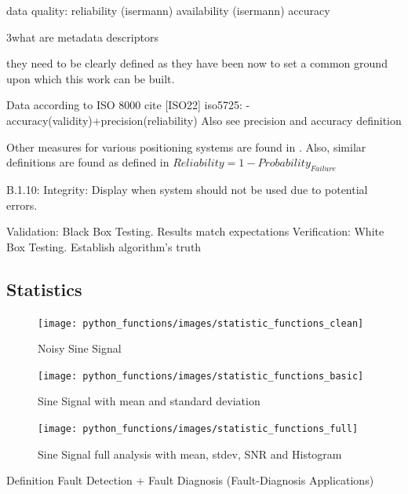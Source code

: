 data quality:
reliability (isermann)
availability (isermann)
accuracy


3what are metadata descriptors

they need to be clearly defined as they have been now to set a common ground upon which this work can be built.

Data according to ISO 8000 cite [ISO22]
iso5725:
-accuracy(validity)+precision(reliability)
Also see precision and accuracy definition \cite[S.33ff.]{smith_scientist_nodate}



Other measures for various positioning systems are found in \textcite{faa_federal_radionavigation_plan_2008}. Also, similar definitions are found as defined in \textcite{isermann_fault-diagnosis_2011}
$Reliability = 1-Probability_{Failure}$
\cite[B.1.5]{faa_federal_radionavigation_plan_2008}

B.1.10: Integrity: Display when system should not be used due to potential errors.

Validation: Black Box Testing. Results match expectations
Verification: White Box Testing. Establish algorithm's truth

\subsection{Statistics}
\cite{smith_scientist_nodate}
\begin{figure}[h]
    \centering
    \texttt{[image: python\_functions/images/statistic\_functions\_clean]}
    \caption{Noisy Sine Signal}
    \label{fig:statistics_clean}
\end{figure}
\begin{figure}[h]
    \centering
    \texttt{[image: python\_functions/images/statistic\_functions\_basic]}
    \caption{Sine Signal with mean and standard deviation}
    \label{fig:statistics_basic}
\end{figure}
\begin{figure}[h]
    \centering
    \texttt{[image: python\_functions/images/statistic\_functions\_full]}
    \caption{Sine Signal full analysis with mean, stdev, SNR and Histogram}
    \label{fig:statistics_full}
\end{figure}


Definition Fault Detection + Fault Diagnosis (Fault-Diagnosis Applications)


